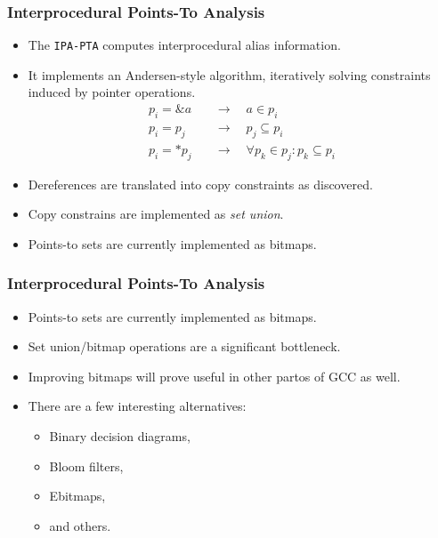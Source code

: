 \documentclass{beamer}
\begin{document}

\begin{frame}[t]
\frametitle{Interprocedural Points-To Analysis}
\begin{itemize}
	\item The {\tt IPA-PTA} computes interprocedural alias information.
	\item It implements an Andersen-style algorithm, iteratively solving
		constraints induced by pointer operations.
		\pause
		\begin{align*}
			\tag{inititialization}
			p_i = \&a \quad &\to \quad a \in p_i \\
			\tag{copy}
			p_i = p_j \quad &\to \quad p_j \subseteq p_i \\
			\tag{dereference}
			p_i = *p_j \quad &\to \quad \forall p_k \in p_j : p_k \subseteq p_i
		\end{align*}
	\pause
	\item Dereferences are translated into copy constraints as discovered.
	\pause
	\item Copy constrains are implemented as {\it set union}.
	\pause
	\item Points-to sets are currently implemented as bitmaps.
\end{itemize}
\end{frame}


\begin{frame}[t]
\frametitle{Interprocedural Points-To Analysis}
\begin{itemize}
	\item<1-> Points-to sets are currently implemented as bitmaps.

\centering
{}
	\item<3-> Set union/bitmap operations are a significant bottleneck.
	\item<4-> Improving bitmaps will prove useful in other partos of GCC as
		well.
	\item<5-> There are a few interesting alternatives:
		\begin{itemize}
			\item Binary decision diagrams,
			\item Bloom filters,
			\item Ebitmaps,
			\item and others.
		\end{itemize}
\end{itemize}

\end{frame}
\end{document}
